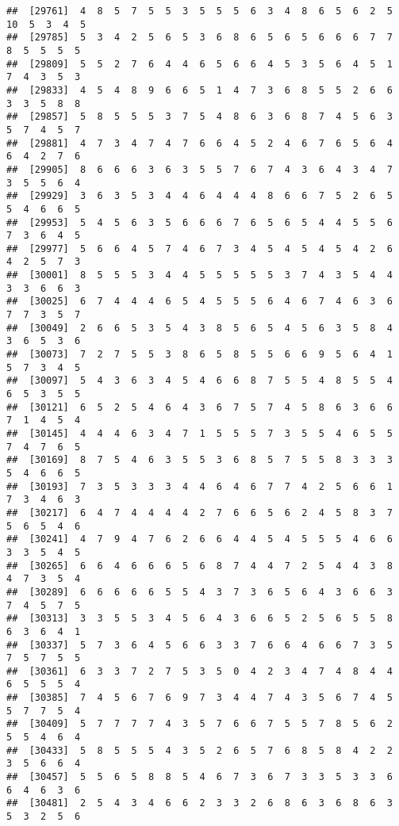 \documentclass[
]{book}
\begin{document}
\begin{verbatim}
##  [29761]  4  8  5  7  5  5  3  5  5  5  6  3  4  8  6  5  6  2  5 10  5  3  4  5
##  [29785]  5  3  4  2  5  6  5  3  6  8  6  5  6  5  6  6  6  7  7  8  5  5  5  5
##  [29809]  5  5  2  7  6  4  4  6  5  6  6  4  5  3  5  6  4  5  1  7  4  3  5  3
##  [29833]  4  5  4  8  9  6  6  5  1  4  7  3  6  8  5  5  2  6  6  3  3  5  8  8
##  [29857]  5  8  5  5  5  3  7  5  4  8  6  3  6  8  7  4  5  6  3  5  7  4  5  7
##  [29881]  4  7  3  4  7  4  7  6  6  4  5  2  4  6  7  6  5  6  4  6  4  2  7  6
##  [29905]  8  6  6  6  3  6  3  5  5  7  6  7  4  3  6  4  3  4  7  3  5  5  6  4
##  [29929]  3  6  3  5  3  4  4  6  4  4  4  8  6  6  7  5  2  6  5  5  4  6  6  5
##  [29953]  5  4  5  6  3  5  6  6  6  7  6  5  6  5  4  4  5  5  6  7  3  6  4  5
##  [29977]  5  6  6  4  5  7  4  6  7  3  4  5  4  5  4  5  4  2  6  4  2  5  7  3
##  [30001]  8  5  5  5  3  4  4  5  5  5  5  5  3  7  4  3  5  4  4  3  3  6  6  3
##  [30025]  6  7  4  4  4  6  5  4  5  5  5  6  4  6  7  4  6  3  6  7  7  3  5  7
##  [30049]  2  6  6  5  3  5  4  3  8  5  6  5  4  5  6  3  5  8  4  3  6  5  3  6
##  [30073]  7  2  7  5  5  3  8  6  5  8  5  5  6  6  9  5  6  4  1  5  7  3  4  5
##  [30097]  5  4  3  6  3  4  5  4  6  6  8  7  5  5  4  8  5  5  4  6  5  3  5  5
##  [30121]  6  5  2  5  4  6  4  3  6  7  5  7  4  5  8  6  3  6  6  7  1  4  5  4
##  [30145]  4  4  4  6  3  4  7  1  5  5  5  7  3  5  5  4  6  5  5  7  4  7  6  5
##  [30169]  8  7  5  4  6  3  5  5  3  6  8  5  7  5  5  8  3  3  3  5  4  6  6  5
##  [30193]  7  3  5  3  3  3  4  4  6  4  6  7  7  4  2  5  6  6  1  7  3  4  6  3
##  [30217]  6  4  7  4  4  4  4  2  7  6  6  5  6  2  4  5  8  3  7  5  6  5  4  6
##  [30241]  4  7  9  4  7  6  2  6  6  4  4  5  4  5  5  5  4  6  6  3  3  5  4  5
##  [30265]  6  6  4  6  6  6  5  6  8  7  4  4  7  2  5  4  4  3  8  4  7  3  5  4
##  [30289]  6  6  6  6  6  5  5  4  3  7  3  6  5  6  4  3  6  6  3  7  4  5  7  5
##  [30313]  3  3  5  5  3  4  5  6  4  3  6  6  5  2  5  6  5  5  8  6  3  6  4  1
##  [30337]  5  7  3  6  4  5  6  6  3  3  7  6  6  4  6  6  7  3  5  7  5  7  5  5
##  [30361]  6  3  3  7  2  7  5  3  5  0  4  2  3  4  7  4  8  4  4  6  5  5  5  4
##  [30385]  7  4  5  6  7  6  9  7  3  4  4  7  4  3  5  6  7  4  5  5  7  7  5  4
##  [30409]  5  7  7  7  7  4  3  5  7  6  6  7  5  5  7  8  5  6  2  5  5  4  6  4
##  [30433]  5  8  5  5  5  4  3  5  2  6  5  7  6  8  5  8  4  2  2  3  5  6  6  4
##  [30457]  5  5  6  5  8  8  5  4  6  7  3  6  7  3  3  5  3  3  6  6  4  6  3  6
##  [30481]  2  5  4  3  4  6  6  2  3  3  2  6  8  6  3  6  8  6  3  5  3  2  5  6

\end{verbatim}
\end{document}
